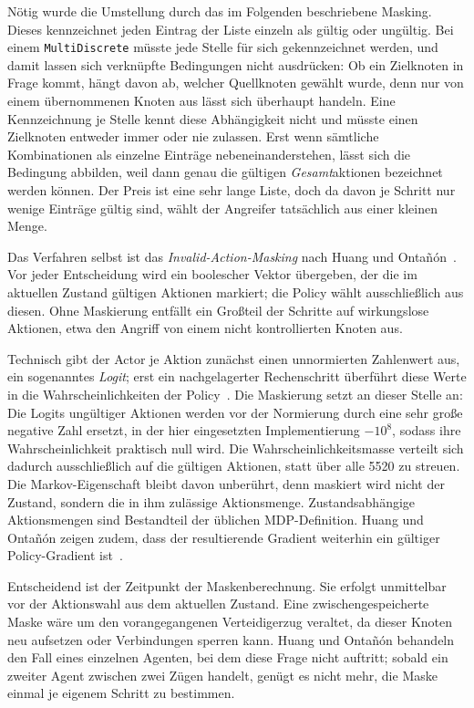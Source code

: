 Nötig wurde die Umstellung durch das im Folgenden beschriebene Masking. Dieses
kennzeichnet jeden Eintrag der Liste einzeln als gültig oder ungültig. Bei einem
\texttt{MultiDiscrete} müsste jede Stelle für sich gekennzeichnet werden, und
damit lassen sich verknüpfte Bedingungen nicht ausdrücken: Ob ein Zielknoten in
Frage kommt, hängt davon ab, welcher Quellknoten gewählt wurde, denn nur von
einem übernommenen Knoten aus lässt sich überhaupt handeln. Eine Kennzeichnung
je Stelle kennt diese Abhängigkeit nicht und müsste einen Zielknoten entweder
immer oder nie zulassen. Erst wenn sämtliche Kombinationen als einzelne
Einträge nebeneinanderstehen, lässt sich die Bedingung abbilden, weil dann genau
die gültigen \emph{Gesamt}aktionen bezeichnet werden können. Der Preis ist eine
sehr lange Liste, doch da davon je Schritt nur wenige Einträge gültig sind,
wählt der Angreifer tatsächlich aus einer kleinen Menge.

Das Verfahren selbst ist das \emph{Invalid-Action-Masking} nach Huang und
Ontañón~\autocite{huang2022masking}. Vor jeder Entscheidung wird
ein boolescher Vektor übergeben, der die im aktuellen Zustand gültigen Aktionen
markiert; die Policy wählt ausschließlich aus diesen. Ohne Maskierung entfällt
ein Großteil der Schritte auf wirkungslose Aktionen, etwa den Angriff von einem
nicht kontrollierten Knoten aus.

Technisch gibt der Actor je Aktion zunächst einen unnormierten Zahlenwert aus,
ein sogenanntes \emph{Logit}; erst ein nachgelagerter Rechenschritt überführt
diese Werte in die Wahrscheinlichkeiten der
Policy~\cite[Abschn.~\glqq Background\grqq{}]{huang2022masking}. Die Maskierung
setzt an dieser Stelle an: Die Logits ungültiger Aktionen werden vor der
Normierung durch eine sehr große negative Zahl ersetzt, in der hier
eingesetzten Implementierung $-10^{8}$, sodass ihre Wahrscheinlichkeit
praktisch null wird. Die Wahrscheinlichkeitsmasse verteilt sich dadurch
ausschließlich auf die gültigen Aktionen, statt über alle 5520 zu streuen. Die
Markov-Eigenschaft bleibt davon unberührt, denn maskiert wird nicht der Zustand,
sondern die in ihm zulässige Aktionsmenge. Zustandsabhängige Aktionsmengen sind
Bestandteil der üblichen \ac{MDP}-Definition. Huang und Ontañón zeigen zudem,
dass der resultierende Gradient weiterhin ein gültiger Policy-Gradient
ist~\autocite{huang2022masking}.

Entscheidend ist der Zeitpunkt der Maskenberechnung. Sie erfolgt unmittelbar
vor der Aktionswahl aus dem aktuellen Zustand. Eine zwischengespeicherte Maske
wäre um den vorangegangenen Verteidigerzug veraltet, da dieser Knoten neu
aufsetzen oder Verbindungen sperren kann. Huang und Ontañón behandeln den Fall
eines einzelnen Agenten, bei dem diese Frage nicht auftritt; sobald ein zweiter
Agent zwischen zwei Zügen handelt, genügt es nicht mehr, die Maske einmal je
eigenem Schritt zu bestimmen.

